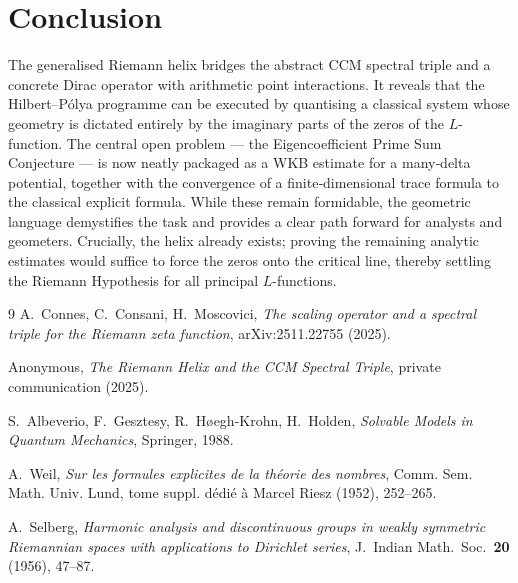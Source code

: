 \documentclass[12pt,a4paper]{article}
\begin{document}
\section{Conclusion}
The generalised Riemann helix bridges the abstract CCM spectral triple and a concrete Dirac operator with arithmetic point interactions.  It reveals that the Hilbert–P\'olya programme can be executed by quantising a classical system whose geometry is dictated entirely by the imaginary parts of the zeros of the $L$-function.  The central open problem --- the Eigencoefficient Prime Sum Conjecture --- is now neatly packaged as a WKB estimate for a many‑delta potential, together with the convergence of a finite‑dimensional trace formula to the classical explicit formula.  While these remain formidable, the geometric language demystifies the task and provides a clear path forward for analysts and geometers.  Crucially, the helix already exists; proving the remaining analytic estimates would suffice to force the zeros onto the critical line, thereby settling the Riemann Hypothesis for all principal $L$-functions.

\begin{thebibliography}{9}
A.~Connes, C.~Consani, H.~Moscovici,
\emph{The scaling operator and a spectral triple for the Riemann zeta function},
arXiv:2511.22755 (2025).

Anonymous, \emph{The Riemann Helix and the CCM Spectral Triple}, private communication (2025).

S.~Albeverio, F.~Gesztesy, R.~H{\o}egh-Krohn, H.~Holden,
\emph{Solvable Models in Quantum Mechanics}, Springer, 1988.

A.~Weil,
\emph{Sur les formules explicites de la th\'eorie des nombres},
Comm. Sem. Math. Univ. Lund, tome suppl. d\'edi\'e \`a Marcel Riesz (1952), 252--265.

A.~Selberg,
\emph{Harmonic analysis and discontinuous groups in weakly symmetric Riemannian spaces with applications to Dirichlet series},
J.~Indian Math.~Soc.~\textbf{20} (1956), 47--87.
\end{thebibliography}
\end{document}
